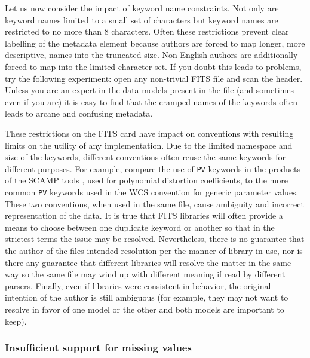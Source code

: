 \documentclass[final,authoryear,5p,times,twocolumn]{elsarticle}
\begin{document}
{{Let us now consider the impact of keyword name constraints. Not only
are keyword names limited to a small set of characters but keyword
names are restricted to no more than 8 characters. Often these
restrictions prevent clear labelling of the metadata element because
authors are forced to map longer, more descriptive, names into the
truncated size. Non-English authors are additionally forced to map
into the limited character set. If you doubt this leads to problems,
try the following experiment: open any non-trivial FITS file and scan
the header. Unless you are an expert in the data models present in the
file (and sometimes even if you are) it is easy to find that the
cramped names of the keywords often leads to arcane and confusing
metadata.


These restrictions on the FITS card have impact on conventions with
resulting limits on the utility of any implementation. Due to the limited
namespace and size of the keywords, different conventions often reuse
the same keywords for different purposes.  For example, compare the use
of \texttt{PV} keywords in the products of the SCAMP tools
\citep{2006ASPC..351..112B}, used for polynomial distortion coefficients,
to the more common \texttt{PV} keywords used in the WCS convention for generic
parameter values. 
These two conventions, when used in the same file, cause ambiguity and
incorrect representation of the data. It is true that FITS libraries
will often provide a means to choose between one duplicate keyword or another
so that in the strictest terms the issue may be resolved.
Nevertheless, there is no guarantee that the author of
the files intended resolution per the manner of library in use, nor is there any
guarantee that different libraries will resolve the matter in the same way
so the same file may wind up with different meaning if read by different parsers.
Finally, even if libraries were consistent in behavior, the original intention
of the author is still ambiguous (for example, they may not want to resolve
in favor of one model or the other and both models are important to keep).


\subsubsection{Insufficient support for missing values}

}}
\end{document}
